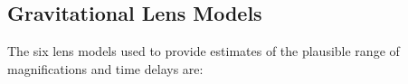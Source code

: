 \subsection{Gravitational Lens Models}\label{sec:LensingModels}



The six lens models used to provide estimates of the plausible range
of magnifications and time delays are:

